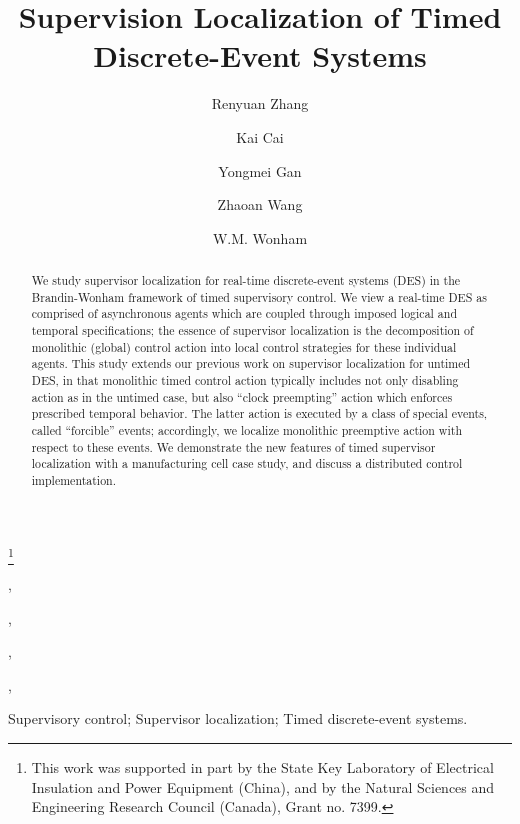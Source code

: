 \documentclass[twocolumn]{autart}
\begin{document}
\begin{frontmatter}

\title{Supervision Localization of Timed Discrete-Event Systems}

\thanks[footnoteinfo]{This work was supported
in part by the State Key Laboratory of Electrical Insulation and
Power Equipment (China), and by the Natural Sciences and Engineering
Research Council (Canada), Grant no. 7399.}

\author[XJTU]{Renyuan Zhang},    \author[UofT]{Kai Cai},               \author[XJTU]{Yongmei Gan},  \author[XJTU]{Zhaoan Wang},
\author[UofT]{W.M. Wonham}

\address[XJTU]{School of Electrical Engineering, Xi'an Jiaotong University, Xi'an, Shaanxi 710049, China}  \address[UofT]{Department of Electrical and Computer Engineering, University of Toronto, Toronto, ON M5S 3G4, Canada}    


\begin{keyword}                           Supervisory control; Supervisor localization; Timed discrete-event systems.               \end{keyword}                             

\begin{abstract}                          We study supervisor localization for real-time discrete-event
systems (DES) in the Brandin-Wonham framework of timed supervisory
control. We view a real-time DES as comprised of asynchronous agents
which are coupled through imposed logical and temporal
specifications; the essence of supervisor localization is the
decomposition of monolithic (global) control action into local
control strategies for these individual agents. This study extends
our previous work on supervisor localization for untimed DES, in
that monolithic timed control action typically includes not only
disabling action as in the untimed case, but also ``clock
preempting'' action which enforces prescribed temporal behavior. The
latter action is executed by a class of special events, called
``forcible'' events; accordingly, we localize monolithic preemptive
action with respect to these events. We demonstrate the new features
of timed supervisor localization with a manufacturing cell case
study, and discuss a distributed control implementation.
\end{abstract}

\end{frontmatter}
\end{document}
